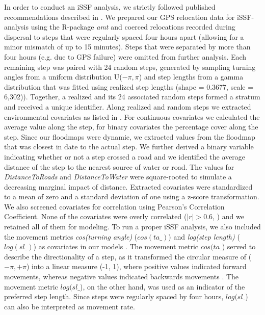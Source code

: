\documentclass[abstract=on,10pt,a4paper,bibliography=totocnumbered]{scrartcl}
\begin{document}
In order to conduct an iSSF analysis, we strictly followed published
recommendations described in \cite{Avgar.2016}. We prepared our GPS relocation
data for iSSF-analysis using the R-package \textit{amt} \citep{Amt.2019} and
coerced relocations recorded during dispersal to steps that were regularly
spaced four hours apart (allowing for a minor mismatch of up to 15 minutes).
Steps that were separated by more than four hours (e.g. due to GPS failure) were
omitted from further analysis. Each remaining step was paired with 24 random
steps, generated by sampling turning angles from a uniform distribution
U(\(-\pi, \pi\)) and step lengths from a gamma distribution that was fitted
using realized step lengths (shape = 0.3677, scale = 6,302)). Together, a
realized and its 24 associated random steps formed a stratum and received a
unique identifier. Along realized and random steps we extracted environmental
covariates as listed in . For continuous covariates we
calculated the average value along the step, for binary covariates the
percentage cover along the step. Since our floodmaps were dynamic, we extracted
values from the floodmap that was closest in date to the actual step. We further
derived a binary variable indicating whether or not a step crossed a road and we
identified the average distance of the step to the nearest source of water or
road. The values for \textit{DistanceToRoads} and \textit{DistanceToWater} were
square-rooted to simulate a decreasing marginal impact of distance. Extracted
covariates were standardized to a mean of zero and a standard deviation of one
using a z-score transformation. We also screened covariates for correlation
using Pearson's Correlation Coefficient. None of the covariates were overly
correlated (\(|r| > 0.6\), \cite{Latham.2011}) and we retained all of them for
modeling. To run a proper iSSF analysis, we also included the movement metrics
\textit{cos(turning angle)} (\(cos(ta\_)\)) and \textit{log(step length)}
(\(log(sl\_)\)) as covariates in our models \citep{Avgar.2016}. The movement
metric \(cos(ta\_\)) served to describe the directionality of a step, as it
transformed the circular measure of (\(-\pi, +\pi\)) into a linear measure (-1,
1), where positive values indicated forward movements, whereas negative values
indicated backwards movements \citep{Turchin.1998}. The movement metric
\(log(sl\_\)), on the other hand, was used as an indicator of the preferred step
length. Since steps were regularly spaced by four hours, \(log(sl\_\)) can also
be interpreted as movement rate.
\end{document}
